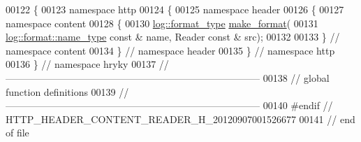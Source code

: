 \begin{DoxyCode}
00122 \{
00123 \textcolor{keyword}{namespace }http
00124 \{
00125 \textcolor{keyword}{namespace }header
00126 \{
00127 \textcolor{keyword}{namespace }content
00128 \{
00130     \hyperlink{namespacehryky_1_1log_ad50448c3f934f1eacd5c1bcffe8111e1}{log::format_type} \hyperlink{namespacehryky_afd615217f648ff164bc40fb82166d959}{make_format}(
00131         \hyperlink{namespacehryky_1_1log_1_1format_ab7408d1e2ed2d648dbf9bba69eb74288}{log::format::name_type} \textcolor{keyword}{const} & name, Reader \textcolor{keyword}{const} & src);
00132 
00133 \} \textcolor{comment}{// namespace content}
00134 \} \textcolor{comment}{// namespace header}
00135 \} \textcolor{comment}{// namespace http}
00136 \} \textcolor{comment}{// namespace hryky}
00137 \textcolor{comment}{//
      ------------------------------------------------------------------------------}
00138 \textcolor{comment}{// global function definitions}
00139 \textcolor{comment}{//
      ------------------------------------------------------------------------------}
00140 \textcolor{preprocessor}{#endif // HTTP\_HEADER\_CONTENT\_READER\_H\_20120907001526677}
00141 \textcolor{preprocessor}{}\textcolor{comment}{// end of file}
\end{DoxyCode}
